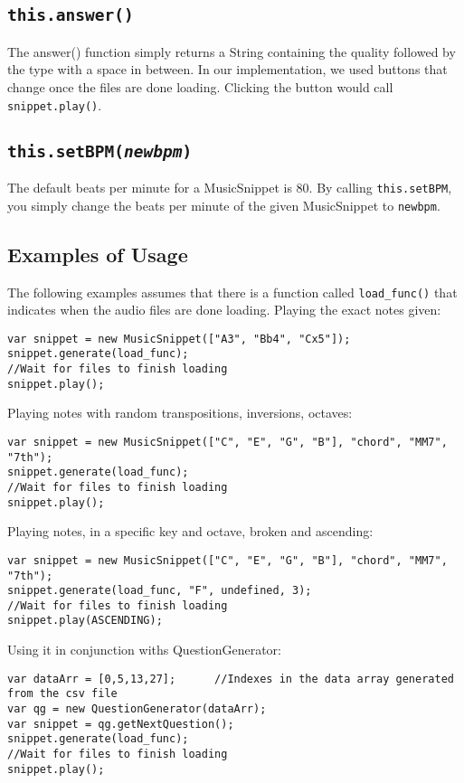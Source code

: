 \documentclass{article}
\begin{document}
\subsection{\texttt{this.answer()}}
The answer() function simply returns a String containing the quality followed by the type with a space in between. In our implementation, we used buttons that change once the files are done loading. Clicking the button would call \texttt{snippet.play()}.

\subsection{\texttt{this.setBPM(\textit{newbpm})}}
The default beats per minute for a MusicSnippet is 80. By calling \texttt{this.setBPM}, you simply change the beats per minute of the given MusicSnippet to \texttt{newbpm}.

\subsection{Examples of Usage}
The following examples assumes that there is a function called \texttt{load\_func()} that indicates when the audio files are done loading.
\vskip 5mm
\noindent Playing the exact notes given:
\begin{lstlisting}
var snippet = new MusicSnippet(["A3", "Bb4", "Cx5"]);
snippet.generate(load_func);
//Wait for files to finish loading
snippet.play();
\end{lstlisting}

\noindent Playing notes with random transpositions, inversions, octaves:
\begin{lstlisting}
var snippet = new MusicSnippet(["C", "E", "G", "B"], "chord", "MM7", "7th");
snippet.generate(load_func);
//Wait for files to finish loading
snippet.play();
\end{lstlisting}

\noindent Playing notes, in a specific key and octave, broken and ascending:
\begin{lstlisting}
var snippet = new MusicSnippet(["C", "E", "G", "B"], "chord", "MM7", "7th");
snippet.generate(load_func, "F", undefined, 3);
//Wait for files to finish loading
snippet.play(ASCENDING);
\end{lstlisting}

\noindent Using it in conjunction withs QuestionGenerator:
\begin{lstlisting}
var dataArr = [0,5,13,27];      //Indexes in the data array generated from the csv file
var qg = new QuestionGenerator(dataArr);
var snippet = qg.getNextQuestion();
snippet.generate(load_func);
//Wait for files to finish loading
snippet.play();
\end{lstlisting}
\end{document}
